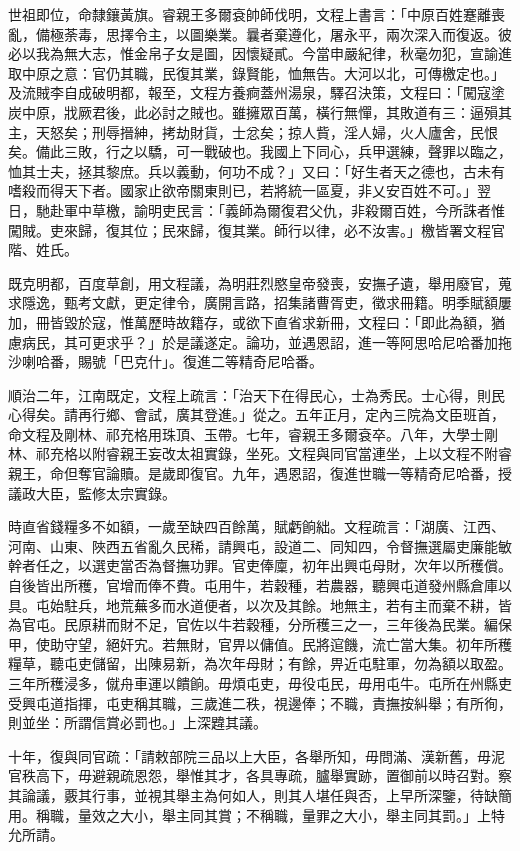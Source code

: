 \begin{pinyinscope}
世祖即位，命隸鑲黃旗。睿親王多爾袞帥師伐明，文程上書言：「中原百姓蹇離喪亂，備極荼毒，思擇令主，以圖樂業。曩者棄遵化，屠永平，兩次深入而復返。彼必以我為無大志，惟金帛子女是圖，因懷疑貳。今當申嚴紀律，秋毫勿犯，宣諭進取中原之意：官仍其職，民復其業，錄賢能，恤無告。大河以北，可傳檄定也。」及流賊李自成破明都，報至，文程方養痾蓋州湯泉，驛召決策，文程曰：「闖寇塗炭中原，戕厥君後，此必討之賊也。雖擁眾百萬，橫行無憚，其敗道有三：逼殞其主，天怒矣；刑辱搢紳，拷劫財貨，士忿矣；掠人貲，淫人婦，火人廬舍，民恨矣。備此三敗，行之以驕，可一戰破也。我國上下同心，兵甲選練，聲罪以臨之，恤其士夫，拯其黎庶。兵以義動，何功不成？」又曰：「好生者天之德也，古未有嗜殺而得天下者。國家止欲帝關東則已，若將統一區夏，非乂安百姓不可。」翌日，馳赴軍中草檄，諭明吏民言：「義師為爾復君父仇，非殺爾百姓，今所誅者惟闖賊。吏來歸，復其位；民來歸，復其業。師行以律，必不汝害。」檄皆署文程官階、姓氏。

既克明都，百度草創，用文程議，為明莊烈愍皇帝發喪，安撫孑遺，舉用廢官，蒐求隱逸，甄考文獻，更定律令，廣開言路，招集諸曹胥吏，徵求冊籍。明季賦額屢加，冊皆毀於寇，惟萬歷時故籍存，或欲下直省求新冊，文程曰：「即此為額，猶慮病民，其可更求乎？」於是議遂定。論功，並遇恩詔，進一等阿思哈尼哈番加拖沙喇哈番，賜號「巴克什」。復進二等精奇尼哈番。

順治二年，江南既定，文程上疏言：「治天下在得民心，士為秀民。士心得，則民心得矣。請再行鄉、會試，廣其登進。」從之。五年正月，定內三院為文臣班首，命文程及剛林、祁充格用珠頂、玉帶。七年，睿親王多爾袞卒。八年，大學士剛林、祁充格以附睿親王妄改太祖實錄，坐死。文程與同官當連坐，上以文程不附睿親王，命但奪官論贖。是歲即復官。九年，遇恩詔，復進世職一等精奇尼哈番，授議政大臣，監修太宗實錄。

時直省錢糧多不如額，一歲至缺四百餘萬，賦虧餉絀。文程疏言：「湖廣、江西、河南、山東、陜西五省亂久民稀，請興屯，設道二、同知四，令督撫選屬吏廉能敏幹者任之，以選吏當否為督撫功罪。官吏俸廩，初年出興屯母財，次年以所穫償。自後皆出所穫，官增而俸不費。屯用牛，若穀種，若農器，聽興屯道發州縣倉庫以具。屯始駐兵，地荒蕪多而水道便者，以次及其餘。地無主，若有主而棄不耕，皆為官屯。民原耕而財不足，官佐以牛若穀種，分所穫三之一，三年後為民業。編保甲，使助守望，絕奸宄。若無財，官畀以傭值。民將逭饑，流亡當大集。初年所穫糧草，聽屯吏儲留，出陳易新，為次年母財；有餘，畀近屯駐軍，勿為額以取盈。三年所穫浸多，僦舟車運以饋餉。毋煩屯吏，毋役屯民，毋用屯牛。屯所在州縣吏受興屯道指揮，屯吏稱其職，三歲進二秩，視邊俸；不職，責撫按糾舉；有所徇，則並坐：所謂信賞必罰也。」上深韙其議。

十年，復與同官疏：「請敕部院三品以上大臣，各舉所知，毋問滿、漢新舊，毋泥官秩高下，毋避親疏恩怨，舉惟其才，各具專疏，臚舉實跡，置御前以時召對。察其論議，覈其行事，並視其舉主為何如人，則其人堪任與否，上早所深鑒，待缺簡用。稱職，量效之大小，舉主同其賞；不稱職，量罪之大小，舉主同其罰。」上特允所請。


\end{pinyinscope}
